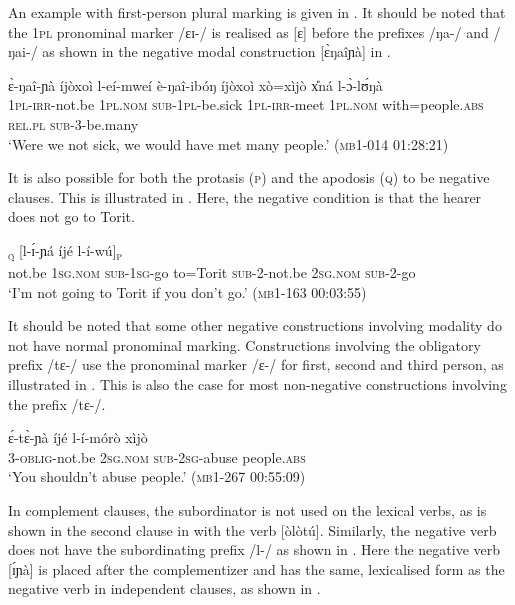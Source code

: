 \documentclass[output=paper,colorlinks,citecolor=brown,draftmode]{langscibook}
\begin{document}
An example with first-person plural marking is given in . It should be noted that the 1\textsc{pl} pronominal marker /ɛɪ-/ is realised as [ɛ] before the prefixes /ŋa-/ and /ŋai-/ as shown in the negative modal construction [ɛ̀ŋaîɲà] in .

\ea\label{ex:lop:51}
        \gll ɛ̀-ŋaî-ɲà íjòxoì l-eí-mweí       è-ŋaî-ibóŋ íjòxoì xò=xìjò x{\U}ná l-ɔ̀-lʊ́ŋà \\
             1\textsc{pl-irr}{}-not.be 1\textsc{pl.nom} \textsc{sub}{}-1\textsc{pl}{}-be.sick 1\textsc{pl-irr}{}-meet 1\textsc{pl.nom} with=people.\textsc{abs} \textsc{rel.pl} \textsc{sub-3}{}-be.many \\
        \glt ‘Were we not sick, we would have met many people.’    (\textsc{mb1-014} \textsc{0}1:28ː21)
\z

It is also possible for both the protasis (\textsc{p}) and the apodosis (\textsc{q}) to be negative clauses. This is illustrated in . Here, the negative condition is that the hearer does not go to Torit. 

\ea\label{ex:lop:52}
        \gll [ɪ́ɲà náŋ l-á-wú à=tòrìt]\textsubscript{\textsc{q}} [l-ɪ́-ɲá íjé l-í-wú]\textsubscript{\textsc{p}} \\ 
             not.be \textsc{1sg.nom} \textsc{sub-1sg}{}-go to=Torit \textsc{sub}{}-2-not.be 2\textsc{sg.nom} \textsc{sub}{}-2-go \\
        \glt ‘I'm not going to Torit if you don't go.’         (\textsc{mb1-163} \textsc{00}:03:55)
\z

It should be noted that some other negative constructions involving modality do not have normal pronominal marking. Constructions involving the obligatory prefix /tɛ-/ use the pronominal marker /ɛ-/ for first, second and third person, as illustrated in . This is also the case for most non-negative constructions involving the prefix /tɛ-/.

\ea\label{ex:lop:53}
        \gll ɛ́-tɛ̀-ɲà íjé l-í-mórò xìjò  \\ 
             3-\textsc{oblig}{}-not.be 2\textsc{sg.nom} \textsc{sub-2sg}{}-abuse people.\textsc{abs} \\
        \glt ‘You shouldn't abuse people.’  (\textsc{mb1-267} \textsc{00:}55:09)
\z

In complement clauses, the subordinator is not used on the lexical verbs, as is shown in the second clause in  with the verb [òlòtú]. Similarly, the negative verb does not have the subordinating prefix /l-/ as shown in .  Here the negative verb [ɪ́ɲà] is placed after the complementizer and has the same, lexicalised form as the negative verb in independent clauses, as shown in . 
\end{document}
